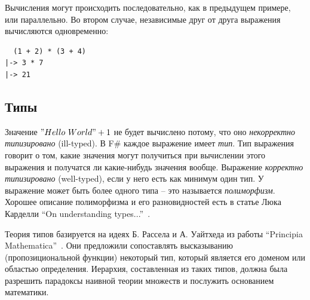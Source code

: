 \documentclass[a4paper,11pt]{article}
\begin{document}
Вычисления могут происходить последовательно, как в предыдущем примере, или
параллельно. Во втором случае, независимые друг от друга выражения вычисляются
одновременно:

\begin{lstlisting}
  (1 + 2) * (3 + 4)
|-> 3 * 7
|-> 21
\end{lstlisting}

\subsection{Типы}

Значение $"Hello~World" + 1$ не будет вычислено потому, что оно
\emph{некорректно типизировано} (ill-typed). В F\# каждое выражение имеет
\emph{тип}. Тип выражения говорит о том, какие значения могут получиться при
вычислении этого выражения и получатся ли какие-нибудь значения вообще.
Выражение \emph{корректно типизировано} (well-typed), если у него есть как 
минимум один тип. У выражение может быть более одного типа -- это называется
\emph{полиморфизм}. Хорошее описание полиморфизма и его разновидностей есть в
статье Люка Карделли ``On understanding types...''~\cite{Cardelli}.

Теория типов базируется на идеях Б. Рассела и А. Уайтхеда из работы ``Principia
Mathematica''~\cite{Russell}. Они предложили сопоставлять высказыванию
(пропозициональной функции) некоторый тип, который является его доменом или
областью определения. Иерархия, составленная из таких типов, должна была
разрешить парадоксы наивной теории множеств и послужить основанием математики.
\end{document}

